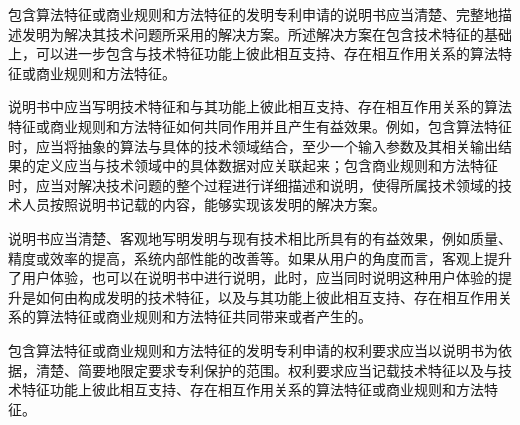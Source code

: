 {\setlength{\parindent}{20.6bp}包含算法特征或商业规则和方法特征的发明专利申请的说明书应当清楚、完整地描述发明为解决其技术问题所采用的解决方案。所述解决方案在包含技术特征的基础上，可以进一步包含与技术特征功能上彼此相互支持、存在相互作用关系的算法特征或商业规则和方法特征。\par}

{\setlength{\parindent}{20.6bp}说明书中应当写明技术特征和与其功能上彼此相互支持、存在相互作用关系的算法特征或商业规则和方法特征如何共同作用并且产生有益效果。例如，包含算法特征时，应当将抽象的算法与具体的技术领域结合，至少一个输入参数及其相关输出结果的定义应当与技术领域中的具体数据对应关联起来；包含商业规则和方法特征时，应当对解决技术问题的整个过程进行详细描述和说明，使得所属技术领域的技术人员按照说明书记载的内容，能够实现该发明的解决方案。\par}

{\setlength{\parindent}{20.6bp}说明书应当清楚、客观地写明发明与现有技术相比所具有的有益效果，例如质量、精度或效率的提高，系统内部性能的改善等。如果从用户的角度而言，客观上提升了用户体验，也可以在说明书中进行说明，此时，应当同时说明这种用户体验的提升是如何由构成发明的技术特征，以及与其功能上彼此相互支持、存在相互作用关系的算法特征或商业规则和方法特征共同带来或者产生的。\par}

{\setlength{\parindent}{20.6bp}包含算法特征或商业规则和方法特征的发明专利申请的权利要求应当以说明书为依据，清楚、简要地限定要求专利保护的范围。权利要求应当记载技术特征以及与技术特征功能上彼此相互支持、存在相互作用关系的算法特征或商业规则和方法特征。\par}

{\setlength{\parindent}{17.5bp}\par}



